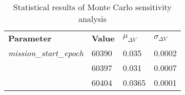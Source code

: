 
                    \begin{table}[]
                    \centering
                    \begin{tabular}{l l l l}
                    \rowcolor[HTML]{EFEFEF} \textbf{Parameter} & \textbf{Value} & \textbf{$\mu_{\Delta V}$} & \textbf{$\sigma_{\Delta V}$} \\
                    \textit{mission\_start\_epoch} & 60390 & 0.035 & 0.0002 \\
 & 60397 & 0.031 & 0.0007 \\
 & 60404 & 0.0365 & 0.0001 \\

                    \end{tabular}
                    \caption{Statistical results of Monte Carlo sensitivity analysis}
                    \label{tab:SensitivityAnalysis}
                    \end{table}
                    